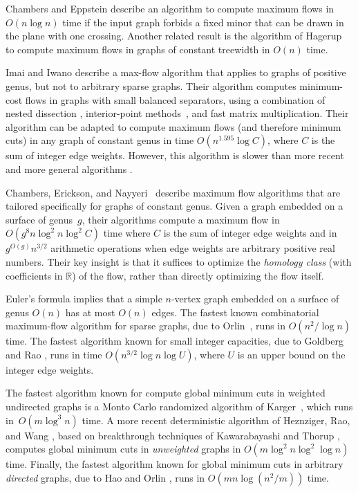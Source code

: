 \documentclass[11pt,twoside]{article}
\def\Real{\mathbb{R}}
\begin{document}
Chambers and Eppstein \cite{ce-focmf-13} describe an algorithm to compute maximum flows in $O(n\log n)$ time if the input graph forbids a fixed minor that can be drawn in the plane with one crossing.  Another related result is the algorithm of Hagerup \etal~\cite{hknr-cmfnc-98} to compute maximum flows in graphs of constant treewidth in $O(n)$ time.

Imai and Iwano \cite{ii-espap-90} describe a max-flow algorithm that applies to graphs of positive genus, but not to arbitrary sparse graphs.
Their algorithm computes minimum-cost flows in graphs with small balanced separators, using a combination of nested dissection \cite{lrt-gnd-79, pr-fepss-93}, interior-point methods~\cite{v-slpfm-89}, and fast matrix multiplication.
Their algorithm can be adapted to compute maximum flows (and therefore minimum cuts) in any graph of constant genus in time $O(n^{1.595}\log C)$, where $C$ is the sum of integer edge weights.
However, this algorithm is slower than more recent and more general algorithms \cite{ds-flgfi-08, gr-bfdb-98}.

Chambers, Erickson, and Nayyeri~\cite{cen-hfcc-12} describe maximum flow algorithms that are tailored specifically for graphs of constant genus.
Given a graph embedded on a surface of genus~$g$, their algorithms compute a maximum flow in  $O(g^8 n \log^2 n \log^2 C)$ time where $C$ is the sum of integer edge weights and in $g^{O(g)}n^{3/2}$ arithmetic operations when edge weights are arbitrary positive real numbers.  Their key insight is that it suffices to optimize the \emph{homology class} (with coefficients in $\Real$) of the flow, rather than directly optimizing the flow itself.

Euler's formula implies that a simple $n$-vertex graph embedded on a surface of genus $O(n)$ has at most $O(n)$ edges.
The fastest known combinatorial maximum-flow algorithm for sparse graphs, due to Orlin~\cite{o-mfotl-13}, runs in $O(n^2 / \log n)$ time.
The fastest algorithm known for small integer capacities, due to Goldberg and Rao \cite{gr-bfdb-98}, runs in time $O(n^{3/2}\log n\log U)$, where $U$ is an upper bound on the integer edge weights.

The fastest algorithm known for compute global minimum cuts in weighted undirected graphs is a Monto Carlo randomized algorithm of Karger~\cite{k-mcnlt-00}, which runs in~$O(m \log^3 n)$ time.
A more recent deterministic algorithm of Heznziger, Rao, and Wang \cite{hrw-lfpfe-17}, based on breakthrough techniques of Kawarabayashi and Thorup \cite{kt-dgmcs-15}, computes global minimum cuts in \emph{unweighted} graphs in $O(m \log^2 n \log^2 \log n)$ time.
Finally, the fastest algorithm known for global minimum cuts in arbitrary \emph{directed} graphs, due to Hao and Orlin \cite{ho-fafmd-94}, runs in $O(mn\log(n^2/m))$ time.
\end{document}
